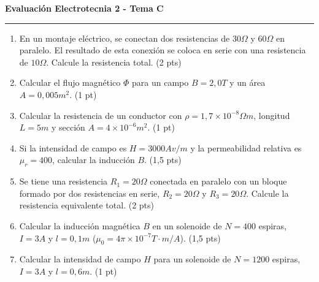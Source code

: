 \documentclass[a4paper,11pt]{article}
\begin{document}
\begin{minipage}[t][0.48\textheight][t]{0.48\textwidth}
  \centering \textbf{Evaluación Electrotecnia 2 - Tema C} \\
  \rule{\textwidth}{0.4pt}
  \begin{enumerate}
    \item En un montaje eléctrico, se conectan dos resistencias de
      $30\Omega$ y $60\Omega$ en paralelo. El resultado de esta
      conexión se coloca en serie con una resistencia de $10\Omega$.
      Calcule la resistencia total. (2 pts)
    \item Calcular el flujo magnético $\Phi$ para un campo $B=2,0T$ y
      un área $A=0,005m^2$. (1 pt)
    \item Calcular la resistencia de un conductor con $\rho=1,7
      \times 10^{-8} \Omega m$, longitud $L=5m$ y sección $A=4 \times
      10^{-6} m^2$. (1 pt)
    \item Si la intensidad de campo es $H=3000 Av/m$ y la
      permeabilidad relativa es $\mu_r=400$, calcular la inducción
      $B$. (1,5 pts)
    \item Se tiene una resistencia $R_1=20\Omega$ conectada en
      paralelo con un bloque formado por dos resistencias en serie,
      $R_2=20\Omega$ y $R_3=20\Omega$. Calcule la resistencia
      equivalente total. (2 pts)
    \item Calcular la inducción magnética $B$ en un solenoide de
      $N=400$ espiras, $I=3A$ y $l=0,1m$ ($\mu_0=4\pi \times 10^{-7}
      T\cdot m/A$). (1,5 pts)
    \item Calcular la intensidad de campo $H$ para un solenoide de
      $N=1200$ espiras, $I=3A$ y $l=0,6m$. (1 pt)
  \end{enumerate}
\end{minipage}
\hfill
\end{document}
